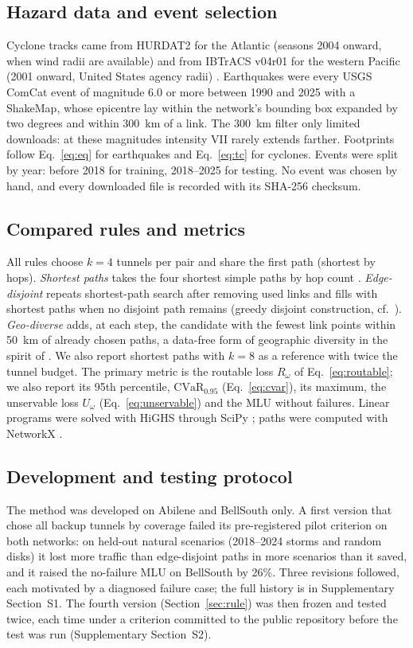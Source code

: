 \documentclass[preprint,12pt]{elsarticle}
\begin{document}
\subsection{Hazard data and event selection}
Cyclone tracks came from HURDAT2 for the Atlantic (seasons 2004 onward, when wind radii are available) \cite{hurdat13} and from IBTrACS v04r01 for the western Pacific (2001 onward, United States agency radii) \cite{ibtracs10}. Earthquakes were every USGS ComCat event of magnitude 6.0 or more between 1990 and 2025 with a ShakeMap, whose epicentre lay within the network's bounding box expanded by two degrees and within 300~km of a link. The 300~km filter only limited downloads: at these magnitudes intensity VII rarely extends farther. Footprints follow Eq.~\eqref{eq:eq} for earthquakes and Eq.~\eqref{eq:tc} for cyclones. Events were split by year: before 2018 for training, 2018--2025 for testing. No event was chosen by hand, and every downloaded file is recorded with its SHA-256 checksum.

\subsection{Compared rules and metrics}
All rules choose $k=4$ tunnels per pair and share the first path (shortest by hops). \emph{Shortest paths} takes the four shortest simple paths by hop count \cite{yen71}. \emph{Edge-disjoint} repeats shortest-path search after removing used links and fills with shortest paths when no disjoint path remains (greedy disjoint construction, cf.\ \cite{suurballe74}). \emph{Geo-diverse} adds, at each step, the candidate with the fewest link points within 50~km of already chosen paths, a data-free form of geographic diversity in the spirit of \cite{giraosilva20}. We also report shortest paths with $k=8$ as a reference with twice the tunnel budget. The primary metric is the routable loss $R_\omega$ of Eq.~\eqref{eq:routable}; we also report its 95th percentile, $\mathrm{CVaR}_{0.95}$ (Eq.~\eqref{eq:cvar}), its maximum, the unservable loss $U_\omega$ (Eq.~\eqref{eq:unservable}) and the MLU without failures. Linear programs were solved with HiGHS \cite{highs18} through SciPy \cite{scipy20}; paths were computed with NetworkX \cite{networkx08}.

\subsection{Development and testing protocol}
\label{sec:protocol}
The method was developed on Abilene and BellSouth only. A first version that chose all backup tunnels by coverage failed its pre-registered pilot criterion on both networks: on held-out natural scenarios (2018--2024 storms and random disks) it lost more traffic than edge-disjoint paths in more scenarios than it saved, and it raised the no-failure MLU on BellSouth by 26\%. Three revisions followed, each motivated by a diagnosed failure case; the full history is in Supplementary Section~S1. The fourth version (Section~\ref{sec:rule}) was then frozen and tested twice, each time under a criterion committed to the public repository before the test was run (Supplementary Section~S2).
\end{document}
